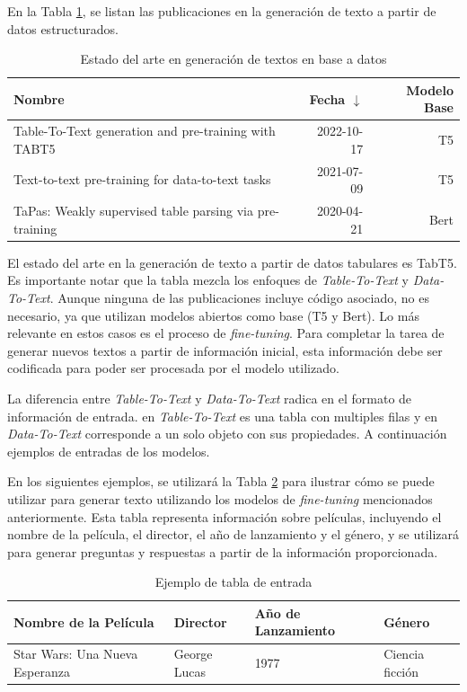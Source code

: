 En la Tabla \ref{tab-sota-text}, se listan las publicaciones en la generación de texto a partir de datos estructurados.

\begin{table}[H]
	\centering
	\caption{Estado del arte en generación de textos en base a datos}
	\label{tab-sota-text}
    \begin{tabular}{|m{20em}|r|r|}
        \hline
        \rowcolor[gray]{0.8}
        Nombre & Fecha $\downarrow$ & Modelo Base \\
        \hline
        Table-To-Text generation and pre-training with TABT5 \cite{andrejczuk_table--text_2022}
        & 2022-10-17
        & T5 \\
        \hline
        Text-to-text pre-training for data-to-text tasks \cite{kale_text--text_2020}
        & 2021-07-09
        & T5 \\
        \hline
        TaPas: Weakly supervised table parsing via pre-training \cite{herzig_tapas_2020}
        & 2020-04-21
        & Bert \\
        \hline
    \end{tabular}
\end{table}

El estado del arte en la generación de texto a partir de datos tabulares es TabT5. Es importante notar que la tabla mezcla los enfoques de \emph{Table-To-Text} y \emph{Data-To-Text}. Aunque ninguna de las publicaciones incluye código asociado, no es necesario, ya que utilizan modelos abiertos como base (T5 y Bert). Lo más relevante en estos casos es el proceso de \emph{fine-tuning}. Para completar la tarea de generar nuevos textos a partir de información inicial, esta información debe ser codificada para poder ser procesada por el modelo utilizado.

La diferencia entre \emph{Table-To-Text} y \emph{Data-To-Text} radica en el formato de información de entrada. en \emph{Table-To-Text} es una tabla con multiples filas y en \emph{Data-To-Text} corresponde a un solo objeto con sus propiedades. A continuación ejemplos de entradas de los modelos.

\newpage
En los siguientes ejemplos, se utilizará la Tabla \ref{tabla-ejemplo-inputs} para ilustrar cómo se puede utilizar para generar texto utilizando los modelos de \emph{fine-tuning} mencionados anteriormente. Esta tabla representa información sobre películas, incluyendo el nombre de la película, el director, el año de lanzamiento y el género, y se utilizará para generar preguntas y respuestas a partir de la información proporcionada.
\begin{table}[H]
	\centering
	\caption{Ejemplo de tabla de entrada}
	\label{tabla-ejemplo-inputs}
    \begin{tabular}{|l|l|l|l|}
        \hline
        \rowcolor[gray]{0.8}
        Nombre de la Película & Director & Año de Lanzamiento & Género \\
        \hline
        Star Wars: Una Nueva Esperanza & George Lucas & 1977 & Ciencia ficción \\
        \hline
    \end{tabular}
        
\end{table}

